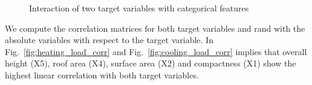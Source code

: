 \documentclass{article}
\begin{document}
\begin{figure}[!bht]
\centering     \captionsetup{font=footnotesize, width=.6\textwidth}
{}
\caption{Interaction of two target variables with categorical features} 
\end{figure}


We compute the correlation matrices for both target variables and rand with the absolute variables with respect to the target variable. In Fig.~\ref{fig:heating_load_corr} and Fig.~\ref{fig:cooling_load_corr} implies that overall height (X5), roof area (X4), surface area (X2) and 
compactness (X1) show the highest linear correlation with both target variables.
\end{document}

